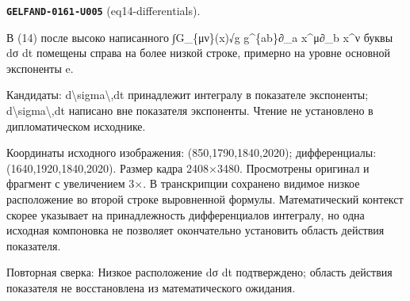 \par\noindent\leavevmode{}\label{GELFAND-0161-U005}\label{GELFAND-P001485:eq14-differentials}\textbf{\texttt{GELFAND-0161-U005}} (eq14-differentials).\nopagebreak[4]\par
В (14) после высоко написанного ∫G\_\{μν\}(x)√g g\textasciicircum{}\{ab\}∂\_a x\textasciicircum{}μ∂\_b x\textasciicircum{}ν буквы dσ dt помещены справа на более низкой строке, примерно на уровне основной экспоненты e.\par
Кандидаты: d\textbackslash{}sigma\textbackslash{},dt принадлежит интегралу в показателе экспоненты; d\textbackslash{}sigma\textbackslash{},dt написано вне показателя экспоненты. Чтение не установлено в дипломатическом исходнике.\par
Координаты исходного изображения: (850,1790,1840,2020); дифференциалы: (1640,1920,1840,2020). Размер кадра 2408×3480. Просмотрены оригинал и фрагмент с увеличением 3×. В транскрипции сохранено видимое низкое расположение во второй строке выровненной формулы. Математический контекст скорее указывает на принадлежность дифференциалов интегралу, но одна исходная компоновка не позволяет окончательно установить область действия показателя.\par
Повторная сверка: Низкое расположение dσ dt подтверждено; область действия показателя не восстановлена из математического ожидания.\par\medskip
